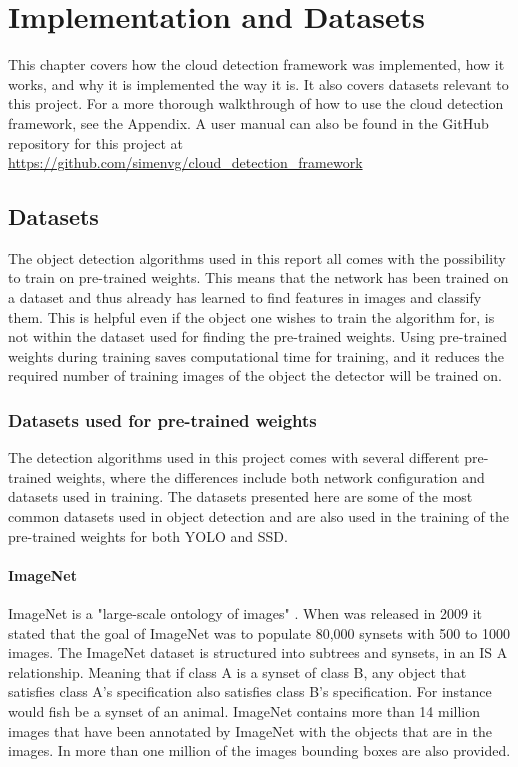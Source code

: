 
\chapter{Implementation and Datasets}

This chapter covers how the cloud detection framework was implemented, how it works, and why it is implemented the way it is. It also covers datasets relevant to this project. For a more thorough walkthrough of how to use the cloud detection framework, see the Appendix. A user manual can also be found in the GitHub repository for this project at \url{https://github.com/simenvg/cloud_detection_framework}

\section{Datasets}
The object detection algorithms used in this report all comes with the possibility to train on pre-trained weights. This means that the network has been trained on a dataset and thus already has learned to find features in images and classify them. This is helpful even if the object one wishes to train the algorithm for, is not within the dataset used for finding the pre-trained weights. Using pre-trained weights during training saves computational time for training, and it reduces the required number of training images of the object the detector will be trained on.

\vspace{3mm}

\subsection{Datasets used for pre-trained weights}
The detection algorithms used in this project comes with several different pre-trained weights, where the differences include both network configuration and datasets used in training. The datasets presented here are some of the most common datasets used in object detection and are also used in the training of the pre-trained weights for both YOLO and SSD.


\subsubsection{ImageNet}
ImageNet is a "large-scale ontology of images" \citep{Deng2009}. When \citep{Deng2009} was released in 2009 it stated that the goal of ImageNet was to populate 80,000 synsets with 500 to 1000 images. The ImageNet dataset is structured into subtrees and synsets, in an IS A relationship. Meaning that if class A is a synset of class B, any object that satisfies class A's specification also satisfies class B's specification. For instance would fish be a synset of an animal. ImageNet contains more than 14 million images that have been annotated by ImageNet with the objects that are in the images. In more than one million of the images bounding boxes are also provided. 



